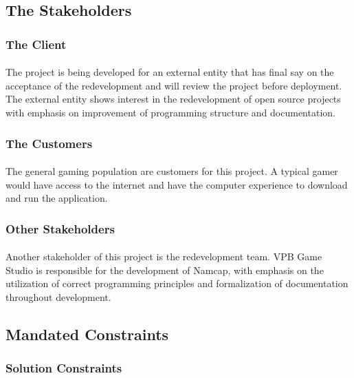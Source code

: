 \documentclass[12pt, titlepage]{article}
\begin{document}
\subsection{The Stakeholders}

\subsubsection{The Client}
\paragraph{}
The project is being developed for an external entity that has final say on the acceptance of the redevelopment and will review the project before deployment. The external entity shows interest in the redevelopment of open source projects with emphasis on improvement of programming structure and documentation.

\subsubsection{The Customers}
\paragraph{}
The general gaming population are customers for this project. A typical gamer would have access to the internet and have the computer experience to download and run the application. 

\subsubsection{Other Stakeholders}
\paragraph{}
Another stakeholder of this project is the redevelopment team. VPB Game Studio is responsible for the development of Namcap, with emphasis on the utilization of correct programming principles and formalization of documentation throughout development.

\subsection{Mandated Constraints}

\subsubsection{Solution Constraints}
\end{document}
